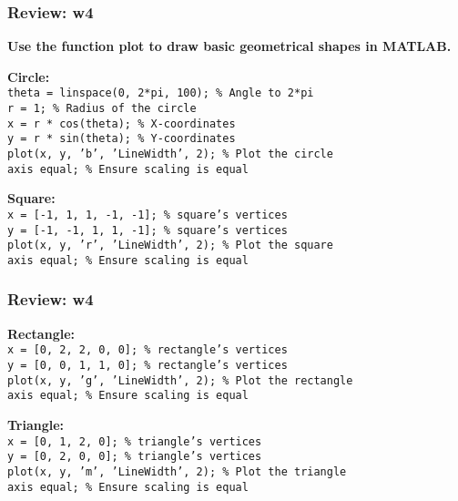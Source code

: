 \documentclass[
	11pt, %
]{beamer}
\begin{document}
\begin{frame}
	\frametitle{Review: w4}

	\textbf{Use the function plot to draw basic geometrical shapes in MATLAB.}
 
\textbf{Circle:} \\
    \texttt{theta = linspace(0, 2*pi, 100);  \% Angle to 2*pi} \\
    \texttt{r = 1;  \% Radius of the circle} \\
    \texttt{x = r * cos(theta);  \% X-coordinates} \\
    \texttt{y = r * sin(theta);  \% Y-coordinates} \\
    \texttt{plot(x, y, 'b', 'LineWidth', 2);  \% Plot the circle} \\
    \texttt{axis equal;  \% Ensure scaling is equal} \\

\vspace{0.5cm}

\textbf{Square:} \\
    \texttt{x = [-1, 1, 1, -1, -1];  \% square's vertices} \\
    \texttt{y = [-1, -1, 1, 1, -1];  \% square's vertices} \\
    \texttt{plot(x, y, 'r', 'LineWidth', 2);  \% Plot the square} \\
    \texttt{axis equal;  \% Ensure scaling is equal} \\

\end{frame}


\begin{frame}
	\frametitle{Review: w4}
 
\textbf{Rectangle:} \\
    \texttt{x = [0, 2, 2, 0, 0];  \% rectangle's vertices} \\
    \texttt{y = [0, 0, 1, 1, 0];  \% rectangle's vertices} \\
    \texttt{plot(x, y, 'g', 'LineWidth', 2);  \% Plot the rectangle} \\
    \texttt{axis equal;  \% Ensure scaling is equal} \\
    
\vspace{0.5cm}

\textbf{Triangle:} \\
    \texttt{x = [0, 1, 2, 0];  \% triangle's vertices} \\
    \texttt{y = [0, 2, 0, 0];  \% triangle's vertices} \\
    \texttt{plot(x, y, 'm', 'LineWidth', 2);  \% Plot the triangle} \\
    \texttt{axis equal;  \% Ensure scaling is equal} \\

\end{frame}
\end{document}
